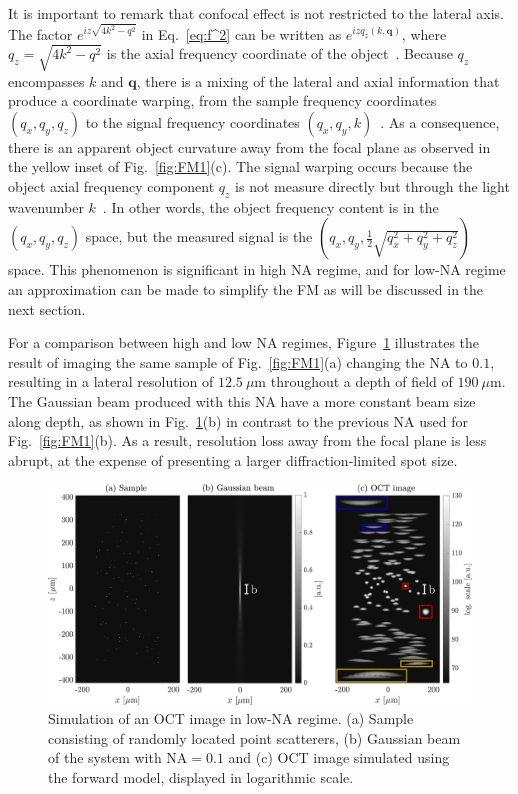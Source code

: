 It is important to remark that confocal effect is not restricted to the lateral axis. The factor $e^{iz\sqrt{4k^2-q^2}}$ in Eq.~\eqref{eq:f^2} can be written as $e^{izq_z(k, \mathbf{q})}$, where $q_z=\sqrt{4k^2-q^2}$ is the axial frequency coordinate of the object~\cite{Davis2007_Nonparaxial}. Because $q_z$ encompasses $k$ and $\mathbf{q}$, there is a mixing of the lateral and axial information that produce a coordinate warping, from the sample frequency coordinates $(q_x, q_y, q_z)$ to the signal frequency coordinates $(q_x, q_y, k)$~\cite{Ralston2006_Inverse}. As a consequence, there is an apparent object curvature away from the focal plane as observed in the yellow inset of Fig.~\ref{fig:FM1}(c). The signal warping occurs because the object axial frequency component $q_z$ is not measure directly but through the light wavenumber $k$~\cite{Fercher2003_Optical}. In other words, the object frequency content is in the $(q_x, q_y, q_z)$ space, but the measured signal is the $(q_x, q_y, \frac{1}{2}\sqrt{q_x^2 + q_y^2 + q_z^2})$ space. This phenomenon is significant in high NA regime, and for low-NA regime an approximation can be made to simplify the FM as will be discussed in the next section.

For a comparison between high and low NA regimes, Figure~\ref{fig:FM2} illustrates the result of imaging the same sample of Fig.~\ref{fig:FM1}(a) changing the NA to $0.1$, resulting in a lateral resolution of $ 12.5~\mu$m throughout a depth of field of $190~\mu$m. The Gaussian beam produced with this NA have a more constant beam size along depth, as shown in Fig.~\ref{fig:FM2}(b) in contrast to the previous NA used for Fig.~\ref{fig:FM1}(b). As a result, resolution loss away from the focal plane is less abrupt, at the expense of presenting a larger diffraction-limited spot size.

\begin{figure}[htb!]
    \centering
    \includegraphics[width=\textwidth]{Figures/TheoreticalBasis/FM-LowNA.pdf}
    \caption[Simulation of an OCT image in low-NA regime.]{Simulation of an OCT image in low-NA regime. (a) Sample consisting of randomly located point scatterers, (b) Gaussian beam of the system with NA$=0.1$ and (c) OCT image simulated using the forward model, displayed in logarithmic scale.}
    \label{fig:FM2}
\end{figure}

